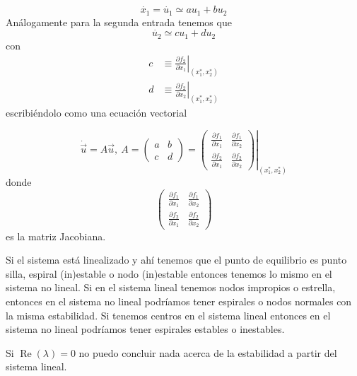 $$
\dot{x_1} = \dot{u_1} \simeq au_1+bu_2 
$$
Análogamente para la segunda entrada tenemos que $$
\dot{u_2}\simeq cu_1+du_2
$$
con $$
\begin{aligned}
  c &\equiv \left. \frac{\partial f_2}{\partial x_1} \right|_{(x_1^*,x_2^*)} \\
    d &\equiv \left. \frac{\partial f_2}{\partial x_2} \right|_{(x_1^*,x_2^*)}
\end{aligned}
$$
escribiéndolo como una ecuación vectorial

$$
\dot{\vec{u}}=A\vec{u} ,\ A = \begin{pmatrix} a & b \\ c & d \end{pmatrix} = \left. \begin{pmatrix} \frac{\partial f_1}{\partial x_1} & \frac{\partial f_1}{\partial x_2} \\ \frac{\partial f_2}{\partial x_1} & \frac{\partial f_2}{\partial x_2}  \end{pmatrix} \right|_{(x_1^*,x_2^*)}
$$
donde $$
\begin{pmatrix} \frac{\partial f_1}{\partial x_1} & \frac{\partial f_1}{\partial x_2} \\ \frac{\partial f_2}{\partial x_1} & \frac{\partial f_2}{\partial x_2}  \end{pmatrix} 
$$ es la matriz Jacobiana. 
\begin{tcolorbox}[colback=Black!4, colframe=Black!9, coltitle=Black] 
Si el sistema está linealizado y ahí tenemos que el punto de equilibrio es punto silla, espiral (in)estable o nodo (in)estable entonces tenemos lo mismo en el sistema no lineal.
Si en el sistema lineal tenemos nodos impropios o estrella, entonces en el sistema no lineal podríamos tener espirales o nodos normales con la misma estabilidad.
Si tenemos centros en el sistema lineal entonces en el sistema no lineal podríamos tener espirales estables o inestables.

Si $\operatorname{Re}(\lambda)=0$ no puedo concluir nada acerca de la estabilidad a partir del sistema lineal.
\end{tcolorbox}

